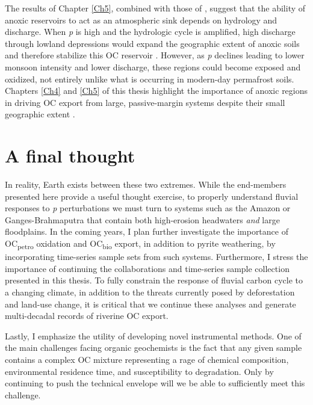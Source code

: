 The results of Chapter \ref{Ch5}, combined with those of \citet{Schefuss:2016cp}, suggest that the ability of anoxic reservoirs to act as an atmospheric  sink depends on hydrology and discharge. When \textit{p} is high and the hydrologic cycle is amplified, high discharge through lowland depressions would expand the geographic extent of anoxic soils and therefore stabilize this OC reservoir \citep{Schefuss:2016cp}. However, as \textit{p} declines leading to lower monsoon intensity and lower discharge, these regions could become exposed and oxidized, not entirely unlike what is occurring in modern-day permafrost soils. Chapters \ref{Ch4} and \ref{Ch5} of this thesis highlight the importance of anoxic regions in driving OC export from large, passive-margin systems despite their small geographic extent \citep[\textit{e.g.} the \textit{Cuvette Congolaise} constitutes $\approx 4$\% of the total Congo Basin;][]{Mayaux:2004uw}.

\section{A final thought}

In reality, Earth exists between these two extremes. While the end-members presented here provide a useful thought exercise, to properly understand fluvial responses to \textit{p} perturbations we must turn to systems such as the Amazon or Ganges-Brahmaputra that contain both high-erosion headwaters \textit{and} large floodplains. In the coming years, I plan further investigate the importance of OC\textsubscript{petro} oxidation and OC\textsubscript{bio} export, in addition to pyrite weathering, by incorporating time-series sample sets from such systems. Furthermore, I stress the importance of continuing the collaborations and time-series sample collection presented in this thesis. To fully constrain the response of fluvial carbon cycle to a changing climate, in addition to the threats currently posed by deforestation and land-use change, it is critical that we continue these analyses and generate multi-decadal records of riverine OC export.

Lastly, I emphasize the utility of developing novel instrumental methods. One of the main challenges facing organic geochemists is the fact that any given sample contains a complex OC mixture representing a rage of chemical composition, environmental residence time, and susceptibility to degradation. Only by continuing to push the technical envelope will we be able to sufficiently meet this challenge.

